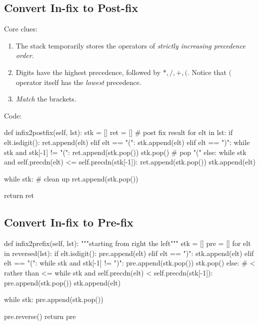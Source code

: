 \subsection{Convert In-fix to Post-fix}
Core clues:
\begin{enumerate}
\item The stack temporarily stores the operators of \textit{strictly increasing precedence order}.
\item Digits have the highest precedence, followed by $*, /, +, ($. Notice that $($ operator itself has the \textit{lowest} precedence.
\item \textit{Match} the brackets. 
\end{enumerate}
Code:
\begin{python}
def infix2postfix(self, lst):
  stk = []
  ret = []  # post fix result
  for elt in lst:
    if elt.isdigit():
      ret.append(elt)
    elif elt == "(":
      stk.append(elt)
    elif elt == ")":
      while stk and stk[-1] != "(":
        ret.append(stk.pop())
      stk.pop()  # pop "("
    else:
      while stk and self.precdn(elt) <= self.precdn(stk[-1]):
        ret.append(stk.pop())
      stk.append(elt)

  while stk:  # clean up 
    ret.append(stk.pop())

  return ret
\end{python}

\subsection{Convert In-fix to Pre-fix}
\begin{python}
  def infix2prefix(self, lst):
    """starting from right the left"""
    stk = []
    pre = []
    for elt in reversed(lst):
      if elt.isdigit():
        pre.append(elt)
      elif elt == ")":
        stk.append(elt)
      elif elt == "(":
        while stk and stk[-1] != ")":
          pre.append(stk.pop())
        stk.pop()
      else:
        # < rather than <=
        while stk and self.precdn(elt) < self.precdn(stk[-1]):  
          pre.append(stk.pop())
        stk.append(elt)

    while stk:
      pre.append(stk.pop())

    pre.reverse()
    return pre
\end{python}

